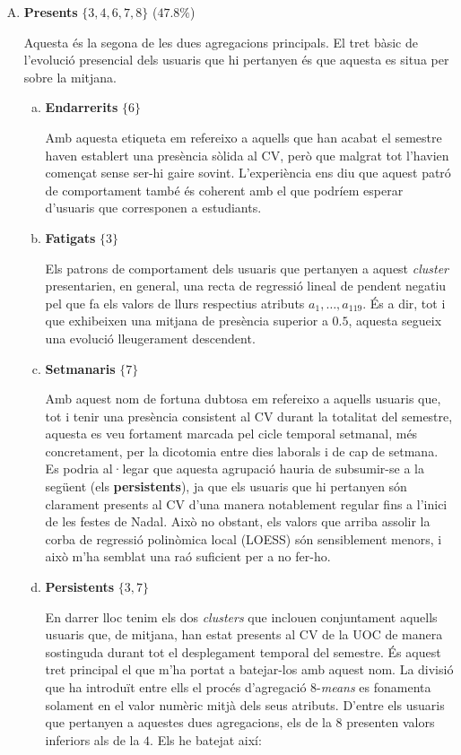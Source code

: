 \documentclass[
	a4paper,
	twoside,
	justified
]{tufte-book}
\begin{document}
\begin{enumerate}[A.]
\begin{enumerate}[a.]
	\end{enumerate}

\item \textbf{Presents} $\{3,4,6,7,8\}$ ($47.8\%$)

	Aquesta és la segona de les dues agregacions principals. El tret bàsic de l'evolució presencial dels usuaris que hi pertanyen és que aquesta es situa per sobre la mitjana.
	
	\begin{enumerate}[a.]
	
	\item \textbf{Endarrerits} $\{6\}$
	
	Amb aquesta etiqueta em refereixo a aquells que han acabat el semestre haven establert una presència sòlida al CV, però que malgrat tot l'havien començat sense ser-hi gaire sovint. L'experiència ens diu que aquest patró de comportament també és coherent amb el que podríem esperar d'usuaris que corresponen a estudiants.
	
	\item \textbf{Fatigats} $\{3\}$
	
	Els patrons de comportament dels usuaris que pertanyen a aquest \emph{cluster} presentarien, en general, una recta de regressió lineal de pendent negatiu pel que fa els valors de llurs respectius atributs $a_1,\ldots,a_{119}$. És a dir, tot i que exhibeixen una mitjana de presència superior a $0.5$, aquesta segueix una evolució lleugerament descendent.
	
	\item \textbf{Setmanaris} $\{7\}$
	
	Amb aquest nom de fortuna dubtosa em refereixo a aquells usuaris que, tot i tenir una presència consistent al CV durant la totalitat del semestre, aquesta es veu fortament marcada pel cicle temporal setmanal, més concretament, per la dicotomia entre dies laborals i de cap de setmana. Es podria al·legar que aquesta agrupació hauria de subsumir-se a la següent (els \textbf{persistents}), ja que els usuaris que hi pertanyen són clarament presents al CV d'una manera notablement regular fins a l'inici de les festes de Nadal. Això no obstant, els valors que arriba assolir la corba de regressió polinòmica local (LOESS) són sensiblement menors, i això m'ha semblat una raó suficient per a no fer-ho.   
	
	\item \textbf{Persistents} $\{3,7\}$
	
	En darrer lloc tenim els dos \emph{clusters} que inclouen conjuntament aquells usuaris que, de mitjana, han estat presents al CV de la UOC de manera sostinguda durant tot el desplegament temporal del semestre. És aquest tret principal el que m'ha portat a batejar-los amb aquest nom. La divisió que ha introduït entre ells el procés d'agregació $8$-\emph{means} es fonamenta solament en el valor numèric mitjà dels seus atributs. D'entre els usuaris que pertanyen a aquestes dues agregacions, els de la $8$ presenten valors inferiors als de la $4$. Els he batejat així:  
	

\end{enumerate}
\end{enumerate}
\end{document}
